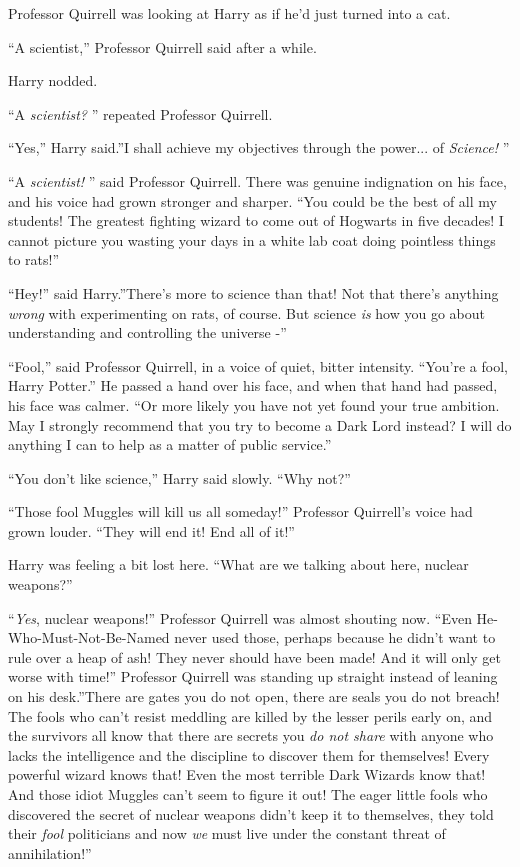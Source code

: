 Professor Quirrell was looking at Harry as if he'd just turned into a
cat.

``A scientist,'' Professor Quirrell said after a while.

Harry nodded.

``A \emph{scientist?} '' repeated Professor Quirrell.

``Yes,'' Harry said.''I shall achieve my objectives through the
power... of \emph{Science!} ''

``A \emph{scientist!} '' said Professor Quirrell. There was genuine
indignation on his face, and his voice had grown stronger and sharper.
``You could be the best of all my students! The greatest fighting wizard
to come out of Hogwarts in five decades! I cannot picture you wasting
your days in a white lab coat doing pointless things to rats!''

``Hey!'' said Harry.''There's more to science than that! Not that
there's anything \emph{wrong} with experimenting on rats, of course. But
science \emph{is} how you go about understanding and controlling the
universe -''

``Fool,'' said Professor Quirrell, in a voice of quiet, bitter
intensity. ``You're a fool, Harry Potter.'' He passed a hand over his
face, and when that hand had passed, his face was calmer. ``Or more
likely you have not yet found your true ambition. May I strongly
recommend that you try to become a Dark Lord instead? I will do anything
I can to help as a matter of public service.''

``You don't like science,'' Harry said slowly. ``Why not?''

``Those fool Muggles will kill us all someday!'' Professor Quirrell's
voice had grown louder. ``They will end it! End all of it!''

Harry was feeling a bit lost here. ``What are we talking about here,
nuclear weapons?''

``\emph{Yes}, nuclear weapons!'' Professor Quirrell was almost shouting
now. ``Even He-Who-Must-Not-Be-Named never used those, perhaps because
he didn't want to rule over a heap of ash! They never should have been
made! And it will only get worse with time!'' Professor Quirrell was
standing up straight instead of leaning on his desk.''There are gates
you do not open, there are seals you do not breach! The fools who can't
resist meddling are killed by the lesser perils early on, and the
survivors all know that there are secrets you \emph{do not share} with
anyone who lacks the intelligence and the discipline to discover them
for themselves! Every powerful wizard knows that! Even the most terrible
Dark Wizards know that! And those idiot Muggles can't seem to figure it
out! The eager little fools who discovered the secret of nuclear weapons
didn't keep it to themselves, they told their \emph{fool} politicians
and now \emph{we} must live under the constant threat of annihilation!''

